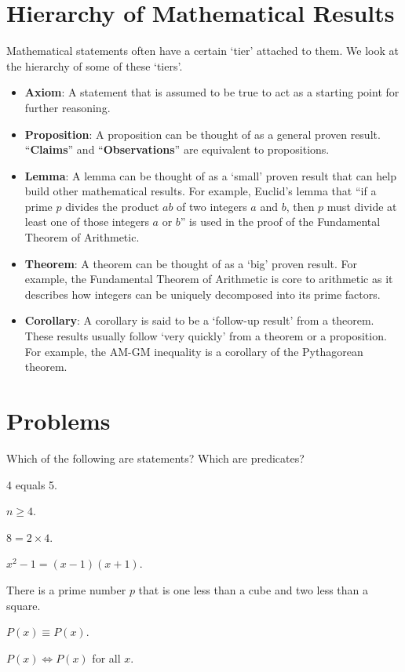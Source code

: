 \section{Hierarchy of Mathematical Results}
Mathematical statements often have a certain `tier' attached to them. We look at the hierarchy of some of these `tiers'.
\begin{itemize}
    \item \textbf{Axiom}: A statement that is assumed to be true to act as a starting point for further reasoning.
    \item \textbf{Proposition}: A proposition can be thought of as a general proven result. ``\textbf{Claims}'' and ``\textbf{Observations}'' are equivalent to propositions.
    \item \textbf{Lemma}: A lemma can be thought of as a `small' proven result that can help build other mathematical results. For example, Euclid's lemma that ``if a prime $p$ divides the product $ab$ of two integers $a$ and $b$, then $p$ must divide at least one of those integers $a$ or $b$'' is used in the proof of the Fundamental Theorem of Arithmetic.
    \item \textbf{Theorem}: A theorem can be thought of as a `big' proven result. For example, the Fundamental Theorem of Arithmetic is core to arithmetic as it describes how integers can be uniquely decomposed into its prime factors.
    \item \textbf{Corollary}: A corollary is said to be a `follow-up result' from a theorem. These results usually follow `very quickly' from a theorem or a proposition. For example, the AM-GM inequality is a corollary of the Pythagorean theorem.
\end{itemize}

\newpage

\section{Problems}
\begin{problem}
    Which of the following are statements? Which are predicates?
    \begin{partquestions}{\alph*}
        \item 4 equals 5.
        \item $n \geq 4$.
        \item $8 = 2 \times 4$.
        \item $x^2 - 1 = (x-1)(x+1)$.
        \item There is a prime number $p$ that is one less than a cube and two less than a square.
        \item $P(x) \equiv P(x)$.
        \item $P(x) \iff P(x)$ for all $x$.
    \end{partquestions}
\end{problem}

